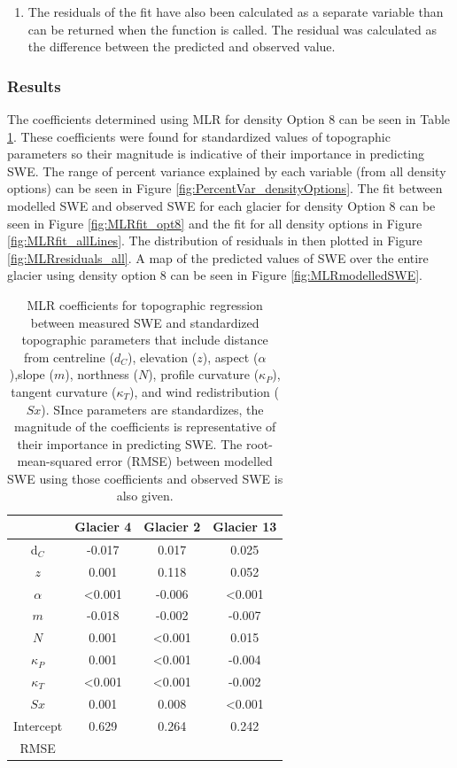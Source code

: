 \documentclass[12pt]{article}
\begin{document}
\begin{enumerate}
\item The residuals of the fit have also been calculated as a separate variable than can be returned when the function is called. The residual was calculated as the difference between the predicted and observed value. 
\end{enumerate}


\subsubsection{Results}

The coefficients determined using MLR for density Option 8 can be seen in Table \ref{tab:MLRcoeff}. These coefficients were found for standardized values of topographic parameters so their magnitude is indicative of their importance in predicting SWE. The range of percent variance explained by each variable (from all density options) can be seen in Figure \ref{fig:PercentVar_densityOptions}. The fit between modelled SWE and observed SWE for each glacier for density Option 8 can be seen in Figure \ref{fig:MLRfit_opt8} and the fit for all density options in Figure \ref{fig:MLRfit_allLines}. The distribution of residuals in then plotted in Figure \ref{fig:MLRresiduals_all}. A map of the predicted values of SWE over the entire glacier using density option 8 can be seen in Figure \ref{fig:MLRmodelledSWE}.

\begin{table}
\centering
\caption{MLR coefficients for topographic regression between measured SWE and standardized topographic parameters that include distance from centreline ($d_C$), elevation ($z$), aspect ($\alpha$),slope ($m$), northness ($N$), profile curvature ($\kappa_P$), tangent curvature ($\kappa_T$), and wind redistribution ($Sx$). SInce parameters are standardizes, the magnitude of the coefficients is representative of their importance in predicting SWE. The root-mean-squared error (RMSE) between modelled SWE using those coefficients and observed SWE is also given.}
\label{tab:MLRcoeff}
\begin{tabular}{cccc}
 & \textbf{Glacier 4} & \textbf{Glacier 2} & \textbf{Glacier 13} \\ \hline
d$_C$ & -0.017 & 0.017 & 0.025 \\
$z$ & 0.001 & 0.118 & 0.052 \\
$\alpha$ & \textless0.001 & -0.006 & \textless0.001 \\
$m$ & -0.018 & -0.002 & -0.007 \\
$N$ & 0.001 & \textless0.001 & 0.015 \\
$\kappa_P$ & 0.001 & \textless0.001 & -0.004 \\
$\kappa_T$ & \textless0.001 & \textless0.001 & -0.002 \\
$Sx$ & 0.001 & 0.008 & \textless0.001 \\
Intercept & 0.629 & 0.264 & 0.242 \\ \hline
RMSE &  &  & 
\end{tabular}
\end{table}
\end{document}
